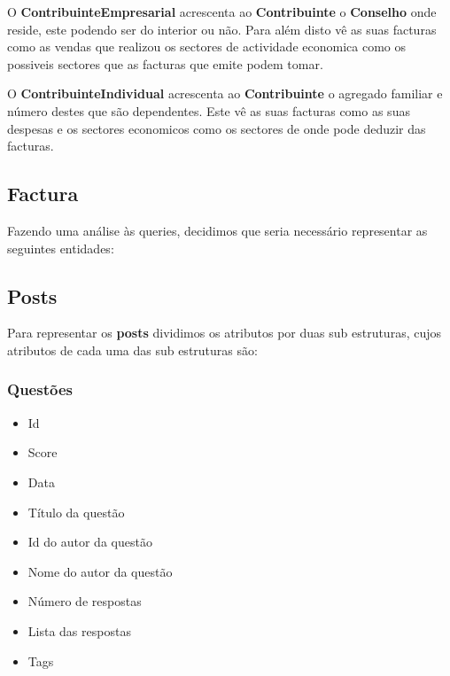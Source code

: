\documentclass[10pt,a4paper]{article}
\begin{document}
    O \textbf{ContribuinteEmpresarial} acrescenta ao \textbf{Contribuinte}
    o \textbf{Conselho} onde reside, este podendo ser do interior ou não. Para
    além disto vê as suas facturas como as vendas que realizou os sectores de
    actividade economica como os possiveis sectores que as facturas que emite
    podem tomar.

    O \textbf{ContribuinteIndividual} acrescenta ao \textbf{Contribuinte}
    o agregado familiar e número destes que são dependentes. Este vê as suas
    facturas como as suas despesas e os sectores economicos como os sectores
    de onde pode deduzir das facturas.

    \subsection{Factura}

    Fazendo uma análise às queries, decidimos que seria necessário representar
    as seguintes entidades:

    \subsection{Posts}
    Para representar os \textbf{posts} dividimos os atributos por duas
     sub estruturas, cujos atributos de cada uma das sub estruturas são:
        \subsubsection{Questões}
        \begin{multicols}{2}
        \begin{itemize}
            \item Id
            \item Score
            \item Data
            \item Título da questão
            \item Id do autor da questão
            \item Nome do autor da questão
            \item Número de respostas
            \item Lista das respostas
            \item Tags
        \end{itemize}
        \end{multicols}
\end{document}
